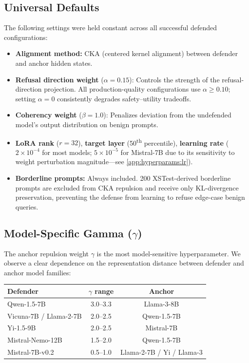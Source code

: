 \subsection{Universal Defaults}
\label{app:hyperparams:defaults}

The following settings were held constant across all successful defended configurations:

\begin{itemize}[nosep,leftmargin=*]
    \item \textbf{Alignment method:} CKA (centered kernel alignment) between defender and anchor hidden states.
    \item \textbf{Refusal direction weight} ($\alpha = 0.15$): Controls the strength of the refusal-direction projection. All production-quality configurations use $\alpha \geq 0.10$; setting $\alpha = 0$ consistently degrades safety--utility tradeoffs.
    \item \textbf{Coherency weight} ($\beta = 1.0$): Penalizes deviation from the undefended model's output distribution on benign prompts.
    \item \textbf{LoRA rank} ($r = 32$), \textbf{target layer} (50\textsuperscript{th} percentile), \textbf{learning rate} ($2 \times 10^{-4}$ for most models; $5 \times 10^{-5}$ for Mistral-7B due to its sensitivity to weight perturbation magnitude---see \cref{app:hyperparams:lr}).
    \item \textbf{Borderline prompts:} Always included. 200 XSTest-derived borderline prompts are excluded from CKA repulsion and receive only KL-divergence preservation, preventing the defense from learning to refuse edge-case benign queries.
\end{itemize}

\subsection{Model-Specific Gamma ($\gamma$)}
\label{app:hyperparams:gamma}

The anchor repulsion weight $\gamma$ is the most model-sensitive hyperparameter. We observe a clear dependence on the representation distance between defender and anchor model families:

\begin{center}
\begin{tabular}{lcc}
\toprule
\textbf{Defender} & \textbf{$\gamma$ range} & \textbf{Anchor} \\
\midrule
Qwen-1.5-7B & 3.0--3.3 & Llama-3-8B \\
Vicuna-7B / Llama-2-7B & 2.0--2.5 & Qwen-1.5-7B \\
Yi-1.5-9B & 2.0--2.5 & Mistral-7B \\
Mistral-Nemo-12B & 1.5--2.0 & Qwen-1.5-7B \\
Mistral-7B-v0.2 & 0.5--1.0 & Llama-2-7B / Yi / Llama-3 \\
\bottomrule
\end{tabular}
\end{center}

